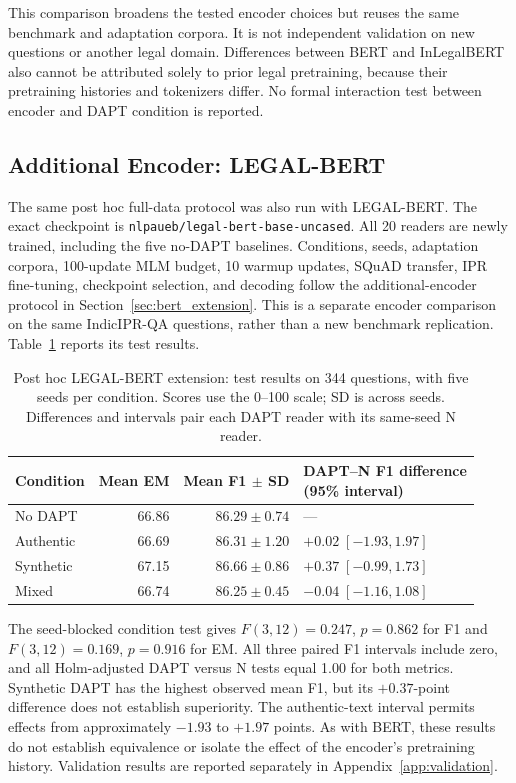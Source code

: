 \documentclass[pdflatex,sn-basic]{sn-jnl}
\begin{document}
This comparison broadens the tested encoder choices but reuses the same
benchmark and adaptation corpora. It is not independent validation on new
questions or another legal domain. Differences between BERT and InLegalBERT
also cannot be attributed solely to prior legal pretraining, because their
pretraining histories and tokenizers differ. No formal interaction test
between encoder and DAPT condition is reported.

\subsection{Additional Encoder: LEGAL-BERT}
\label{sec:legalbert_extension}

The same post hoc full-data protocol was also run with LEGAL-BERT. The exact
checkpoint is \texttt{nlpaueb/legal-bert-base-uncased}. All 20 readers are
newly trained, including the five no-DAPT baselines. Conditions, seeds, adaptation corpora,
100-update MLM budget, 10 warmup updates, SQuAD transfer, IPR fine-tuning,
checkpoint selection, and decoding follow the additional-encoder protocol in
Section~\ref{sec:bert_extension}. This is a separate encoder comparison on
the same IndicIPR-QA questions, rather than a new benchmark replication.
Table~\ref{tab:legalbert_extension_test} reports its test results.

\begin{table}[!htbp]
\caption{Post hoc LEGAL-BERT extension: test results on 344 questions, with
five seeds per condition. Scores use the 0--100 scale; SD is across seeds.
Differences and intervals pair each DAPT reader with its same-seed N reader.}
\label{tab:legalbert_extension_test}
\centering\scriptsize
\begin{tabular}{@{}lrr>{\raggedright\arraybackslash}p{4.4cm}@{}}
\toprule
Condition & Mean EM & Mean F1 $\pm$ SD & \shortstack[l]{DAPT--N F1 difference\\(95\% interval)} \\
\midrule
No DAPT & 66.86 & $86.29\pm0.74$ & --- \\
Authentic & 66.69 & $86.31\pm1.20$ & $+0.02\;[-1.93,1.97]$ \\
Synthetic & 67.15 & $86.66\pm0.86$ & $+0.37\;[-0.99,1.73]$ \\
Mixed & 66.74 & $86.25\pm0.45$ & $-0.04\;[-1.16,1.08]$ \\
\bottomrule
\end{tabular}
\end{table}

The seed-blocked condition test gives \(F(3,12)=0.247\), \(p=0.862\) for
F1 and \(F(3,12)=0.169\), \(p=0.916\) for EM. All three paired F1
intervals include zero, and all Holm-adjusted DAPT versus N tests equal 1.00
for both metrics. Synthetic DAPT has the highest observed mean F1, but its
$+0.37$-point difference does not establish superiority. The authentic-text
interval permits effects from approximately $-1.93$ to $+1.97$ points.
As with BERT, these results do not establish equivalence or isolate the
effect of the encoder's pretraining history. Validation results are reported
separately in Appendix~\ref{app:validation}.
\end{document}
